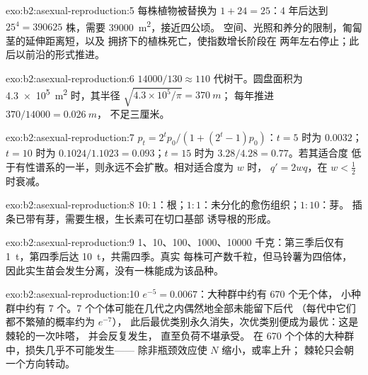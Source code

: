 \begin{solution}{exo:b2:asexual-reproduction:5}
每株植物被替换为 $1 + 24 = 25$：4 年后达到 $25^{4} =
\num{390625}$ 株，需要 \qty{39000}{m^2}，接近四公顷。
空间、光照和养分的限制，匍匐茎的延伸距离短，以及
拥挤下的植株死亡，使指数增长阶段在
两年左右停止；此后以前沿的形式推进。
\end{solution}

\begin{solution}{exo:b2:asexual-reproduction:6}
$\num{14000}/130 \approx 110$ 代树干。圆盘面积为
\qty{4.3e5}{m^2} 时，其半径 $\sqrt{4.3\times 10^{5}/\pi} = \qty{370}{m}$；
每年推进 $370/\num{14000} = \qty{0.026}{m}$，
不足三厘米。
\end{solution}

\begin{solution}{exo:b2:asexual-reproduction:7}
$p_t = 2^{t}p_0/(1 + (2^{t} - 1)p_0)$：$t = 5$ 时为 $0.0032$；$t = 10$
时为 $0.1024/1.1023 = 0.093$；$t = 15$ 时为 $3.28/4.28 = 0.77$。若其适合度
低于有性谱系的一半，则永远不会扩散。相对适合度为 $w$ 时，
$q' = 2wq$，在 $w <
\tfrac12$ 时衰减。
\end{solution}

\begin{solution}{exo:b2:asexual-reproduction:8}
$10 : 1$：根；$1 : 1$：未分化的愈伤组织；$1 : 10$：芽。
插条已带有芽，需要生根，生长素可在切口基部
诱导根的形成。
\end{solution}

\begin{solution}{exo:b2:asexual-reproduction:9}
1、10、100、\num{1000}、\num{10000} 千克：第三季后仅有
\qty{1}{t}，第四季后达 \qty{10}{t}，共需四季。真实
每株可产数千粒，但马铃薯为四倍体，
因此实生苗会发生分离，没有一株能成为该品种。
\end{solution}

\begin{solution}{exo:b2:asexual-reproduction:10}
$e^{-5} = 0.0067$：大种群中约有 670 个无个体，
小种群中约有 7 个。7 个个体可能在几代之内偶然地全部未能留下后代
（每代中它们都不繁殖的概率约为 $e^{-7}$），
此后最优类别永久消失，次优类别便成为最优：这是棘轮的一次咔嗒，
并会反复发生，
直至负荷不堪承受。
在 670 个个体的大种群中，损失几乎不可能发生——
除非瓶颈效应使 $N$ 缩小，或率上升；
棘轮只会朝一个方向转动。
\end{solution}

